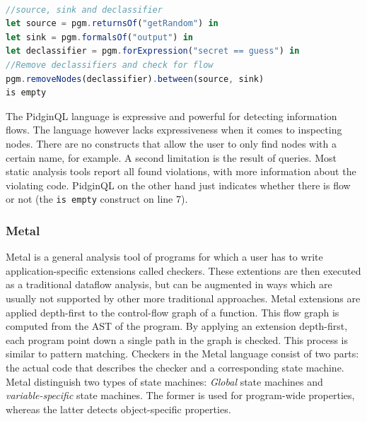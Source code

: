 \begin{lstlisting}[label={lst:PidginExample},language=JavaScript,caption=A typical PidginQL query,mathescape=true]  % float=t?

//source, sink and declassifier
let source = pgm.returnsOf("getRandom") in 			
let sink = pgm.formalsOf("output") in 				
let declassifier = pgm.forExpression("secret == guess") in
//Remove declassifiers and check for flow
pgm.removeNodes(declassifier).between(source, sink)	 		
is empty											
\end{lstlisting}

The PidginQL language is expressive and powerful for detecting information flows. The language however lacks expressiveness when it comes to inspecting nodes. There are no constructs that allow the user to only find nodes with a certain name, for example. A second limitation is the result of queries. Most static analysis tools report all found violations, with more information about the violating code. PidginQL on the other hand just indicates whether there is flow or not (the \texttt{is empty} construct on line 7).

\subsubsection*{Metal}

Metal\cite{Metal} is a general analysis tool of programs for which a user has to write application-specific extensions called checkers. These extentions are then executed as a traditional dataflow analysis, but can be augmented in ways which are usually not supported by other more traditional approaches. Metal extensions are applied depth-first to the control-flow graph of a function. This flow graph is computed from the AST of the program. By applying an extension depth-first, each program point down a single path in the graph is checked. This process is similar to pattern matching. Checkers in the Metal language consist of two parts: the actual code that describes the checker and a corresponding state machine. Metal distinguish two types of state machines: \textit{Global} state machines and \textit{variable-specific} state machines. The former is used for program-wide properties, whereas the latter detects object-specific properties. 

